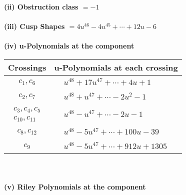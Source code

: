 \documentclass[1p]{elsarticle_modified}
\theoremstyle{definition}
\begin{document}
\flushleft \textbf{(ii) Obstruction class $= -1$}\\~\\
\flushleft \textbf{(iii) Cusp Shapes $= 4 u^{46}-4 u^{45}+\cdots+12 u-6$}\\~\\
\newpage\renewcommand{\arraystretch}{1}
\flushleft \textbf{(iv) u-Polynomials at the component}\newline \\
\begin{tabular}{m{50pt}|m{274pt}}
Crossings & \hspace{64pt}u-Polynomials at each crossing \\
\hline $$\begin{aligned}c_{1},c_{6}\end{aligned}$$&$\begin{aligned}
&u^{48}+17 u^{47}+\cdots+4 u+1
\end{aligned}$\\
\hline $$\begin{aligned}c_{2},c_{7}\end{aligned}$$&$\begin{aligned}
&u^{48}+u^{47}+\cdots-2 u^2-1
\end{aligned}$\\
\hline $$\begin{aligned}c_{3},c_{4},c_{5}\\c_{10},c_{11}\end{aligned}$$&$\begin{aligned}
&u^{48}- u^{47}+\cdots-2 u-1
\end{aligned}$\\
\hline $$\begin{aligned}c_{8},c_{12}\end{aligned}$$&$\begin{aligned}
&u^{48}-5 u^{47}+\cdots+100 u-39
\end{aligned}$\\
\hline $$\begin{aligned}c_{9}\end{aligned}$$&$\begin{aligned}
&u^{48}-5 u^{47}+\cdots+912 u+1305
\end{aligned}$\\
\hline
\end{tabular}\\~\\
\newpage\renewcommand{\arraystretch}{1}
\flushleft \textbf{(v) Riley Polynomials at the component}\newline \\
\end{document}
